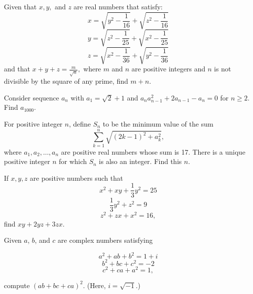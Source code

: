 \documentclass{article}
\begin{document}
\begin{req}[AIME II 2006/15]{4}
Given that $x, y,$ and $z$ are real numbers that satisfy:
\[x = \sqrt{y^2-\frac{1}{16}}+\sqrt{z^2-\frac{1}{16}}\]
\[y = \sqrt{z^2-\frac{1}{25}}+\sqrt{x^2-\frac{1}{25}}\]
\[z = \sqrt{x^2-\frac{1}{36}}+\sqrt{y^2-\frac{1}{36}}\]
and that $x+y+z = \frac{m}{\sqrt{n}},$ where $m$ and $n$ are positive integers and $n$ is not divisible by the square of any prime, find $m+n.$
\end{req}


\begin{prob}[]{4}
Consider sequence $a_n$ with $a_1=\sqrt{2}+1$ and $a_na_{n-1}^2+2a_{n-1}-a_n=0$ for $n\geq 2.$ Find $a_{1000}.$
\end{prob}

\begin{prob}[AIME 1991/15]{6}
For positive integer $n$, define $S_n$ to be the minimum value of the sum\[ \sum_{k=1}^n \sqrt{(2k-1)^2+a_k^2}, \]where $a_1,a_2,\ldots,a_n$ are positive real numbers whose sum is 17. There is a unique positive integer $n$ for which $S_n$ is also an integer. Find this $n$.
\end{prob}


\begin{prob}[]{6}
If $x,y,z$ are positive numbers such that
    \[x^2+xy+\frac{1}{3}y^2=25\]
    \[\frac{1}{3}y^2+z^2=9\]
    \[z^2+zx+x^2=16,\]
    find $xy+2yz+3zx.$
\end{prob}

\begin{prob}{9}
Given $a$, $b$, and $c$ are complex numbers satisfying

\[ a^2+ab+b^2=1+i \]
\[ b^2+bc+c^2=-2 \]
\[ c^2+ca+a^2=1, \]

compute $(ab+bc+ca)^2$. (Here, $i=\sqrt{-1}$.)
\end{prob}
\end{document}
